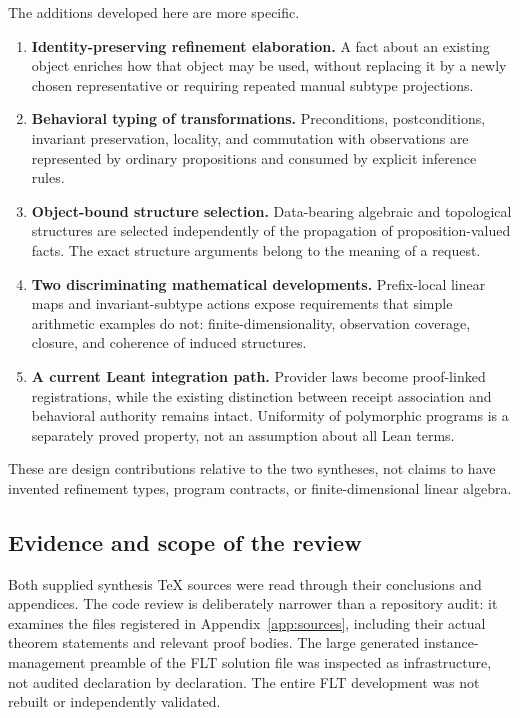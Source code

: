 \documentclass[11pt,a4paper]{article}
\theoremstyle{plain}
\theoremstyle{definition}
\begin{document}
The additions developed here are more specific.
\begin{enumerate}
\item \textbf{Identity-preserving refinement elaboration.} A fact about an existing object enriches how that object may be used, without replacing it by a newly chosen representative or requiring repeated manual subtype projections.
\item \textbf{Behavioral typing of transformations.} Preconditions, postconditions, invariant preservation, locality, and commutation with observations are represented by ordinary propositions and consumed by explicit inference rules.
\item \textbf{Object-bound structure selection.} Data-bearing algebraic and topological structures are selected independently of the propagation of proposition-valued facts. The exact structure arguments belong to the meaning of a request.
\item \textbf{Two discriminating mathematical developments.} Prefix-local linear maps and invariant-subtype actions expose requirements that simple arithmetic examples do not: finite-dimensionality, observation coverage, closure, and coherence of induced structures.
\item \textbf{A current Leant integration path.} Provider laws become proof-linked registrations, while the existing distinction between receipt association and behavioral authority remains intact. Uniformity of polymorphic programs is a separately proved property, not an assumption about all Lean terms.
\end{enumerate}
These are design contributions relative to the two syntheses, not claims to have invented refinement types, program contracts, or finite-dimensional linear algebra.

\subsection{Evidence and scope of the review}
Both supplied synthesis TeX sources were read through their conclusions and appendices. The code review is deliberately narrower than a repository audit: it examines the files registered in Appendix~\ref{app:sources}, including their actual theorem statements and relevant proof bodies. The large generated instance-management preamble of the FLT solution file was inspected as infrastructure, not audited declaration by declaration. The entire FLT development was not rebuilt or independently validated.
\end{document}
